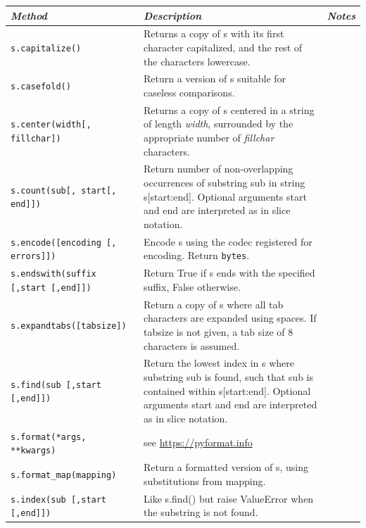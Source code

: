 \documentclass[9pt,a4wide]{extarticle}
\begin{document}
\begin{supertabular}{|l|p{9cm}|c|}\hline
{\em Method}            & {\em Description}                    &  {\em Notes} \\ \hline\hline

{\tt s.capitalize() }   &    Returns a copy of s with its first character capitalized, and the rest of the characters lowercase.   &        \\ \hline

{\tt s.casefold() }   &  Return a version of s suitable for caseless comparisons. &   \\ \hline 
{\tt s.center(width[, fillchar])} &    
Returns a copy of s centered in a string of length {\em width}, surrounded by the appropriate number of {\em fillchar} characters.  &
    \\ \hline

{\tt s.count(sub[, start[, end]])}   &  Return number of non-overlapping occurrences of substring sub in string s[start:end].  Optional arguments start and end are interpreted as in slice notation.  &        \\ \hline

{\tt s.encode([encoding [, errors]]) }  & Encode s using the codec registered for encoding. Return {\tt bytes}.   &    \\ \hline

{\tt s.endswith(suffix [,start [,end]]) }  & Return True if s ends with the specified suffix, False otherwise. &        \\ \hline

{\tt s.expandtabs([tabsize]) }  &  Return a copy of s where all tab characters are expanded using spaces.  If tabsize is not given, a tab size of 8 characters is assumed.
&        \\ \hline

{\tt s.find(sub [,start [,end]]) }   &  Return the lowest index in s where substring sub is found, such that sub is contained within s[start:end].  Optional
arguments start and end are interpreted as in slice notation.&        \\ \hline

{\tt s.format(*args, **kwargs) }   &  see \url{https://pyformat.info}               &        \\ \hline

{\tt s.format\_map(mapping) }   & Return a formatted version of s, using substitutions from mapping.  &        \\ \hline

{\tt s.index(sub [,start [,end]]) }   &   Like s.find() but raise ValueError when the substring is not found.   &        \\ \hline


\end{supertabular}
\end{document}
